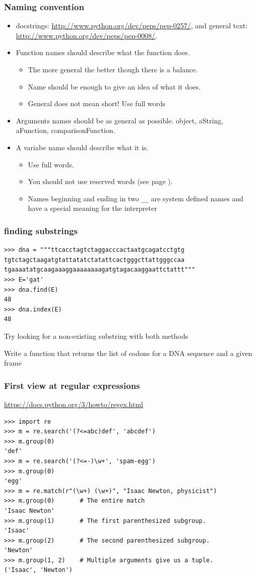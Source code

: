 \documentclass{beamer}
\begin{document}
\begin{frame}
\frametitle{Naming convention}
\begin{itemize}
\item docstrings: \url{http://www.python.org/dev/peps/pep-0257/}, and general text: \url{http://www.python.org/dev/peps/pep-0008/}.
\item Function names should describe what the function does. 
\begin{itemize}
\item The more general the better though there is a balance. 
\item Name should be enough to give an idea of what it does. 
\item General does not mean short! Use full words
\end{itemize}
\item Arguments names should be as general as possible. object, aString, aFunction, comparisonFunction.
\item A variabe name should describe what it is. 
\begin{itemize}
\item Use full words. 
\item You should not use reserved words (see page \pageref{ref:reserved}).
\item Names beginning and ending in two \texttt{\_\_} are system defined names and have a special meaning for the interpreter
\end{itemize}
\end{itemize}
\end{frame}

\begin{frame}[containsverbatim]
\frametitle{finding substrings}
\begin{lstlisting}
>>> dna = """ttcacctagtctaggacccactaatgcagatcctgtg
tgtctagctaagatgtattatatctatattcactgggcttattgggccaa
tgaaaatatgcaagaaaggaaaaaaaagatgtagacaaggaattctattt"""
>>> E='gat'
>>> dna.find(E)
48
>>> dna.index(E)
48
\end{lstlisting}
Try looking for a non-existing substring with both methods
\begin{example}
Write a function that returns the list of codons for a DNA sequence and a given frame
\end{example}
\end{frame}

\begin{frame}[containsverbatim]
\frametitle{First view at regular expressions}
\footnotesize\url{https://docs.python.org/3/howto/regex.html}\normalsize
\normalsize
\begin{lstlisting}
>>> import re
>>> m = re.search('(?<=abc)def', 'abcdef')
>>> m.group(0)
'def'
>>> m = re.search('(?<=-)\w+', 'spam-egg')
>>> m.group(0)
'egg'
>>> m = re.match(r"(\w+) (\w+)", "Isaac Newton, physicist")
>>> m.group(0)       # The entire match
'Isaac Newton'
>>> m.group(1)       # The first parenthesized subgroup.
'Isaac'
>>> m.group(2)       # The second parenthesized subgroup.
'Newton'
>>> m.group(1, 2)    # Multiple arguments give us a tuple.
('Isaac', 'Newton')
\end{lstlisting}
\end{frame}
\end{document}
